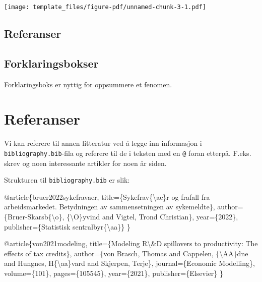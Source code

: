 \documentclass[
  10pt,
]{scrartcl}
\newenvironment{Shaded}{\begin{snugshade}}{\end{snugshade}}
\newcommand{\NormalTok}[1]{\textcolor[rgb]{0.00,0.23,0.31}{#1}}
\begin{document}
\texttt{[image: template\_files/figure-pdf/unnamed-chunk-3-1.pdf]}

\subsection{Referanser}\label{referanser}

\subsection{Forklaringsbokser}\label{forklaringsbokser}

\begin{tcolorbox}[enhanced jigsaw, coltitle=black, left=2mm, leftrule=.75mm, toptitle=1mm, opacitybacktitle=0.6, colbacktitle=quarto-callout-note-color!10!white, arc=.35mm, colback=white, bottomrule=.15mm, opacityback=0, rightrule=.15mm, breakable, title=\textcolor{quarto-callout-note-color}{\faInfo}\hspace{0.5em}{Forklaringsboks}, bottomtitle=1mm, colframe=quarto-callout-note-color-frame, titlerule=0mm, toprule=.15mm]

Forklaringsboks er nyttig for oppsummere et fenomen.

\end{tcolorbox}

\section{Referanser}\label{referanser-1}

Vi kan referere til annen litteratur ved å legge inn informasjon i
\texttt{bibliography.bib}-fila og referere til de i teksten med en
\texttt{@} foran etterpå. F.eks. skrev \citet{bruer2022sykefravaer} og
\citet{von2021modeling} noen interessante artikler for noen år siden.

Strukturen til \texttt{bibliography.bib} er slik:

\begin{Shaded}
\begin{Highlighting}[]
\NormalTok{@article\{bruer2022sykefravaer,}
\NormalTok{  title=\{Sykefrav\{\textbackslash{}ae\}r og frafall fra arbeidsmarkedet. Betydningen av sammensetningen av sykemeldte\},}
\NormalTok{  author=\{Bruer{-}Skarsb\{\textbackslash{}o\}, \{\textbackslash{}O\}yvind and Vigtel, Trond Christian\},}
\NormalTok{  year=\{2022\},}
\NormalTok{  publisher=\{Statistisk sentralbyr\{\textbackslash{}aa\}\}}
\NormalTok{\}}

\NormalTok{@article\{von2021modeling,}
\NormalTok{  title=\{Modeling R\textbackslash{}\&D spillovers to productivity: The effects of tax credits\},}
\NormalTok{  author=\{von Brasch, Thomas and Cappelen, \{\textbackslash{}AA\}dne and Hungnes, H\{\textbackslash{}aa\}vard and Skjerpen, Terje\},}
\NormalTok{  journal=\{Economic Modelling\},}
\NormalTok{  volume=\{101\},}
\NormalTok{  pages=\{105545\},}
\NormalTok{  year=\{2021\},}
\NormalTok{  publisher=\{Elsevier\}}
\NormalTok{\}}
\end{Highlighting}
\end{Shaded}
\end{document}
